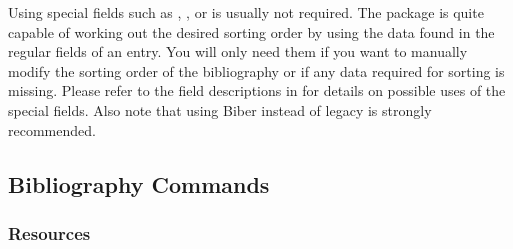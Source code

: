 \documentclass{ltxdockit}[2011/03/25]
\newcommand*{\biber}{Biber\xspace}
\begin{document}
Using special fields such as , , or  is usually not required. The  package is quite capable of working out the desired sorting order by using the data found in the regular fields of an entry. You will only need them if you want to manually modify the sorting order of the bibliography or if any data required for sorting is missing. Please refer to the field descriptions in  for details on possible uses of the special fields. Also note that using \biber instead of legacy \bibtex is strongly recommended.

\subsection{Bibliography Commands}
\label{use:bib}

\subsubsection{Resources}
\label{use:bib:res}
\end{document}

